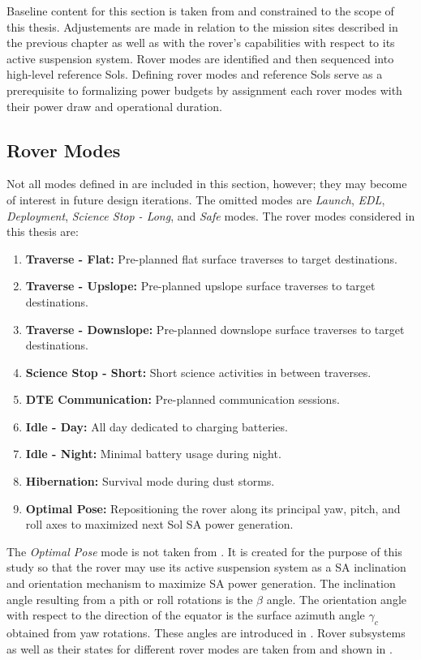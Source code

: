 Baseline content for this section is taken from  and constrained to the scope of this thesis. Adjustements are made in relation to the mission sites described in the previous chapter as well as with the rover's capabilities with respect to its active suspension system. Rover modes are identified and then sequenced into high-level reference Sols. Defining rover modes and reference Sols serve as a prerequisite to formalizing power budgets by assignment each rover modes with their power draw and operational duration.

\subsection{Rover Modes}
\label{sec:ReferenceSols:RoverModes}
Not all modes defined in  are included in this section, however; they may become of interest in future design iterations. The omitted modes are \textit{Launch}, \textit{\ac{EDL}}, \textit{Deployment}, \textit{Science Stop - Long},  and \textit{Safe} modes. The rover modes considered in this thesis are:

\begin{enumerate}[label=\textcolor{BulletBlue}{(\alph*)}]
    \item \textbf{Traverse - Flat:} Pre-planned flat surface traverses to target destinations.
    \item \textbf{Traverse - Upslope:} Pre-planned upslope surface traverses to target destinations.
    \item \textbf{Traverse - Downslope:} Pre-planned downslope surface traverses to target destinations.
    \item \textbf{Science Stop - Short:} Short science activities in between traverses.
    \item \textbf{\ac{DTE} Communication:} Pre-planned communication sessions.
    \item \textbf{Idle - Day:} All day dedicated to charging batteries.
    \item \textbf{Idle - Night:} Minimal battery usage during night.
    \item \textbf{Hibernation:} Survival mode during dust storms.
    \item \textbf{Optimal Pose:} Repositioning the rover along its principal yaw, pitch, and roll axes to maximized next Sol \ac{SA} power generation.
\end{enumerate}

The \textit{Optimal Pose} mode is not taken from . It is created for the purpose of this study so that the rover may use its active suspension system as a \ac{SA} inclination and orientation mechanism to maximize \ac{SA} power generation. The inclination angle resulting from a pith or roll rotations is  the $\beta$ angle. The orientation angle with respect to the direction of the equator is the surface azimuth angle $\gamma_{c}$ obtained from yaw rotations. These angles are introduced in . Rover subsystems as well as their states for different rover modes are taken from  and shown in .

